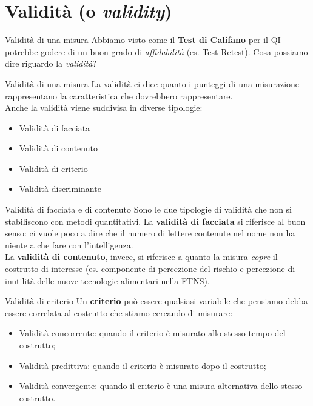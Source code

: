\documentclass{beamer}
\begin{document}
\section{Validità (o \textit{validity})}
\begin{frame}{Validità di una misura}
    Abbiamo visto come il \textbf{Test di Califano} per il QI potrebbe godere di un buon grado di \textit{affidabilità} (es. Test-Retest). Cosa possiamo dire riguardo la \textit{validità}?
\end{frame}

\begin{frame}{Validità di una misura}
    La validità ci dice quanto i punteggi di una misurazione rappresentano la caratteristica che dovrebbero rappresentare. \\
    \vspace{1em}
    Anche la validità viene suddivisa in diverse tipologie:
    \begin{itemize}
        \item Validità di facciata
        \item Validità di contenuto
        \item Validità di criterio
        \item Validità discriminante
    \end{itemize}
\end{frame}

\begin{frame}{Validità di facciata e di contenuto}
    Sono le due tipologie di validità che non si stabiliscono con metodi quantitativi. La \textbf{validità di facciata} si riferisce al buon senso: ci vuole poco a dire che il numero di lettere contenute nel nome non ha niente a che fare con l'intelligenza. \\
    \vspace{1em}
    La \textbf{validità di contenuto}, invece, si riferisce a quanto la misura \textit{copre} il costrutto di interesse (es. componente di percezione del rischio e percezione di inutilità delle nuove tecnologie alimentari nella FTNS).
\end{frame}

\begin{frame}{Validità di criterio}
    Un \textbf{criterio} può essere qualsiasi variabile che pensiamo debba essere correlata al costrutto che stiamo cercando di misurare: \\
    \begin{itemize}
        \item Validità concorrente: quando il criterio è misurato allo stesso tempo del costrutto;
        \item Validità predittiva: quando il criterio è misurato dopo il costrutto;
        \item Validità convergente: quando il criterio è una misura alternativa dello stesso costrutto.
    \end{itemize}
\end{frame}
\end{document}

